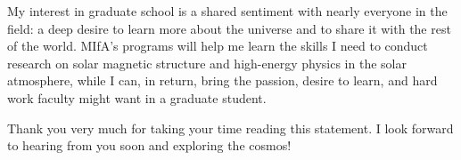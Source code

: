 \documentclass[11pt,letterpaper]{article}
\begin{document}
My interest in graduate school is a shared sentiment with nearly everyone in the field: a deep desire to learn more about the universe and to share it with the rest of the world. MIfA’s programs will help me learn the skills I need to conduct research on solar magnetic structure and high-energy physics in the solar atmosphere, while I can, in return, bring the passion, desire to learn, and hard work faculty might want in a graduate student. 

Thank you very much for taking your time reading this statement. I look forward to hearing from you soon and exploring the cosmos!
\end{document}
